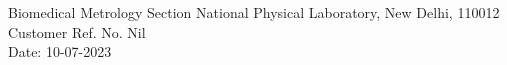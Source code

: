 Biomedical Metrology Section National Physical Laboratory, New Delhi, 110012 \\
Customer Ref. No. Nil \\
Date: 10-07-2023